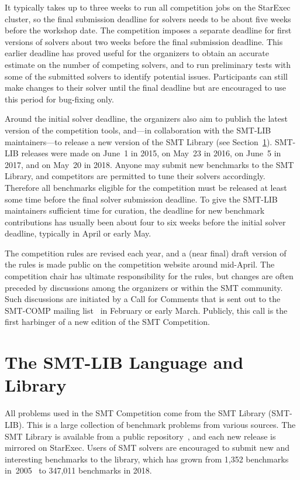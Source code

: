 \documentclass[twoside,11pt]{article}
\begin{document}
It typically takes up to three weeks to run all competition jobs on
the StarExec cluster, so the final submission deadline for solvers
needs to be about five weeks before the workshop date.  The
competition imposes a separate deadline for first versions of solvers
about two weeks before the final submission deadline.  This earlier
deadline has proved useful for the organizers to obtain an accurate
estimate on the number of competing solvers, and to run preliminary
tests with some of the submitted solvers to identify potential issues.
Participants can still make changes to their solver until the final
deadline but are encouraged to use this period for bug-fixing only.

Around the initial solver deadline, the organizers also aim to publish
the latest version of the competition tools, and---in collaboration
with the SMT-LIB maintainers---to release a new version of the SMT
Library (see Section~\ref{sec:smtlib}).  SMT-LIB releases were made on
June~1 in 2015, on May~23 in 2016, on June~5 in 2017, and on May~20 in
2018.  Anyone may submit new benchmarks to the SMT Library, and
competitors are permitted to tune their solvers accordingly.
Therefore all benchmarks eligible for the competition must be released
at least some time before the final solver submission deadline.  To
give the SMT-LIB maintainers sufficient time for curation, the
deadline for new benchmark contributions has usually been about four
to six weeks before the initial solver deadline, typically in April or
early May.

The competition rules are revised each year, and a (near final) draft
version of the rules is made public on the competition website around
mid-April.  The competition chair has ultimate responsibility for the
rules, but changes are often preceded by discussions among the
organizers or within the SMT community.  Such discussions are
initiated by a Call for Comments that is sent out to the SMT-COMP
mailing list~\cite{smtcomp-mailinglist} in February or early March.
Publicly, this call is the first harbinger of a new edition of the SMT
Competition.


\section{The SMT-LIB Language and Library}
\label{sec:smtlib}

All problems used in the SMT Competition come from the SMT Library
(SMT-LIB).  This is a large collection of benchmark problems from
various sources.  The SMT Library is available from a public
repository~\cite{smtlib-repository}, and each new release is mirrored
on StarExec.  Users of SMT solvers are encouraged to submit new and
interesting benchmarks to the library, which has grown from 1,352
benchmarks in~2005~\cite{BdMS05} to 347,011 benchmarks in 2018.
\end{document}
